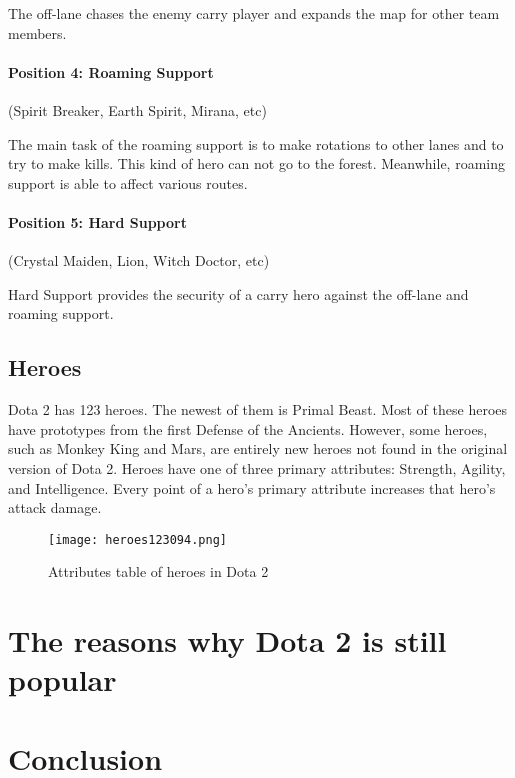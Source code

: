 \documentclass[12pt,twoside,english,a4paper]{article}
\begin{document}
The off-lane chases the enemy carry player and expands the map for other team members.
\paragraph{Position 4: Roaming Support}(Spirit Breaker, Earth Spirit, Mirana, etc)

The main task of the roaming support is to make rotations to other lanes and to try to make kills. This kind of hero can not go to the forest. Meanwhile, roaming support is able to affect various routes.
\paragraph{Position 5: Hard Support} (Crystal Maiden, Lion, Witch Doctor, etc)

Hard Support provides the security of a carry hero against the off-lane and roaming support.

\subsection{Heroes} \label{heroes}
Dota 2 has 123 heroes. The newest of them is Primal Beast. Most of these heroes have prototypes from the first Defense of the Ancients. However, some heroes, such as Monkey King and Mars, are entirely new heroes not found in the original version of Dota 2.
Heroes have one of three primary attributes: Strength, Agility, and Intelligence. Every point of a hero's primary attribute increases that hero's attack damage.
 \begin{figure}[H]
  \centering
  \caption{Attributes table of heroes in Dota 2\cite{Heroes:DOTA}}
  \texttt{[image: heroes123094.png]}
  \label{fig:heroes}
 \end{figure}  


\section{The reasons why Dota 2 is still popular} \label{the reasons why Dota 2 is still popular}

\section{Conclusion} \label{conclusion} %






\end{document}
